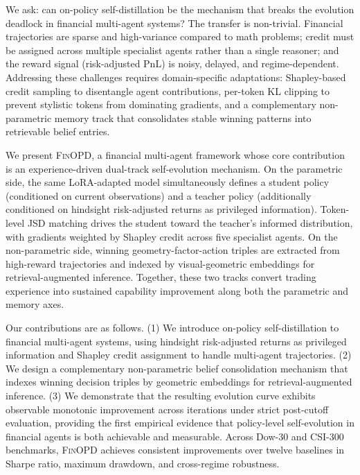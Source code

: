 We ask: can on-policy self-distillation be the mechanism that breaks the evolution deadlock in financial multi-agent systems? The transfer is non-trivial. Financial trajectories are sparse and high-variance compared to math problems; credit must be assigned across multiple specialist agents rather than a single reasoner; and the reward signal (risk-adjusted PnL) is noisy, delayed, and regime-dependent. Addressing these challenges requires domain-specific adaptations: Shapley-based credit sampling to disentangle agent contributions, per-token KL clipping to prevent stylistic tokens from dominating gradients, and a complementary non-parametric memory track that consolidates stable winning patterns into retrievable belief entries.

We present \textsc{FinOPD}, a financial multi-agent framework whose core contribution is an experience-driven dual-track self-evolution mechanism. On the parametric side, the same LoRA-adapted model simultaneously defines a student policy (conditioned on current observations) and a teacher policy (additionally conditioned on hindsight risk-adjusted returns as privileged information). Token-level JSD matching drives the student toward the teacher's informed distribution, with gradients weighted by Shapley credit across five specialist agents. On the non-parametric side, winning geometry-factor-action triples are extracted from high-reward trajectories and indexed by visual-geometric embeddings for retrieval-augmented inference. Together, these two tracks convert trading experience into sustained capability improvement along both the parametric and memory axes.

Our contributions are as follows. (1) We introduce on-policy self-distillation to financial multi-agent systems, using hindsight risk-adjusted returns as privileged information and Shapley credit assignment to handle multi-agent trajectories. (2) We design a complementary non-parametric belief consolidation mechanism that indexes winning decision triples by geometric embeddings for retrieval-augmented inference. (3) We demonstrate that the resulting evolution curve exhibits observable monotonic improvement across iterations under strict post-cutoff evaluation, providing the first empirical evidence that policy-level self-evolution in financial agents is both achievable and measurable. Across Dow-30 and CSI-300 benchmarks, \textsc{FinOPD} achieves consistent improvements over twelve baselines in Sharpe ratio, maximum drawdown, and cross-regime robustness.
